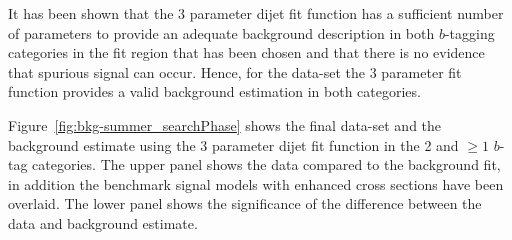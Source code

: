 It has been shown that the 3 parameter dijet fit function has a
sufficient number of parameters to provide an adequate background
description in both $b$-tagging categories in the fit region that has been chosen
and that there is no evidence that spurious signal can occur.
Hence, for the \summer{} data-set the 3 parameter fit function
provides a valid background estimation in both categories.

Figure~\ref{fig:bkg-summer_searchPhase} shows the final
\summer{} data-set and the background estimate using the 3 parameter dijet fit function
in the 2 and $\geq1$ $b$-tag categories.
The upper panel shows the data compared to the background fit,
in addition the benchmark signal models with enhanced cross sections have been overlaid.
The lower panel shows the significance of the difference between the data and background estimate.


